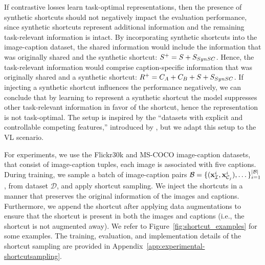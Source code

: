 If contrastive losses learn task-optimal representations, then the presence of synthetic shortcuts should not negatively impact the evaluation performance, since synthetic shortcuts represent additional information and the remaining task-relevant information is intact.
By incorporating synthetic shortcuts into the image-caption dataset, the shared information would include the information that was originally shared and the synthetic shortcut:
$S^{+} = S + \sct{}$.
Hence, the task-relevant information would comprise caption-specific information that was originally shared and a synthetic shortcut:
$R^{+} = C_A + C_B + S + \sct{}$. 
If injecting a synthetic shortcut influences the performance negatively, we can conclude that by learning to represent a synthetic shortcut the model suppresses other task-relevant information in favor of the shortcut, hence the representation is not task-optimal.
The setup is inspired by the ``datasets with explicit and controllable competing features,'' introduced by \cite{chen2021intriguing}, but we adapt this setup to the \ac{VL} scenario.

For experiments, we use the \ac{Flickr30k} and \ac{MS-COCO} image-caption datasets, that consist of image-caption tuples, each image is associated with five captions.
During training, we sample a batch of image-caption pairs $\mathcal{B} = \{(\img{i}, \capt{i}{j}), \dots\}_{i=1}^{|\mathcal{B}|}$, from dataset $\mathcal{D}$, and apply shortcut sampling.
We inject the shortcuts in a manner that preserves the original information of the images and captions. 
Furthermore, we append the shortcut after applying data augmentations to ensure that the shortcut is present in both the images and captions (i.e., the shortcut is not augmented away).
We refer to Figure~\ref{fig:shortcut_examples} for some examples.
The training, evaluation, and implementation details of the shortcut sampling are provided in Appendix~\ref{app:experimental-shortcutsampling}.


